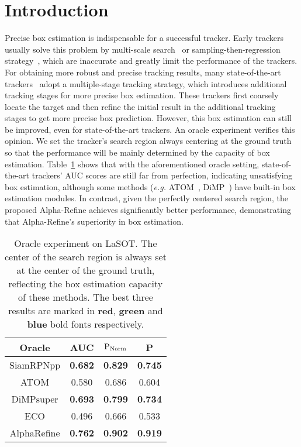 \documentclass[final]{cvpr}
\begin{document}
\section{Introduction}
Precise box estimation is indispensable for a successful tracker.
Early trackers usually solve this problem by multi-scale search~\cite{SiameseFC,ECO,DRT,unveiling} 
or sampling-then-regression strategy~\cite{SINT,MDNet}, which are inaccurate and greatly limit the performance of the trackers. 
For obtaining more robust and precise tracking results, many state-of-the-art trackers~\cite{SPM,CascadedSiameseRPN,ATOM,DiMP} 
adopt a multiple-stage tracking strategy, which introduces additional tracking stages for more precise box estimation. 
These trackers first coarsely locate the target and then refine the initial result in the additional tracking stages 
to get more precise box prediction.
However, this box estimation can still be improved, even for state-of-the-art trackers.
An oracle experiment verifies this opinion. 
We set the tracker’s search region always centering at the ground truth so that
the performance will be mainly determined by the capacity of box estimation.
Table~\ref{tab:oracle} shows that with the aforementioned oracle setting, state-of-the-art trackers' 
AUC scores are still far from perfection, indicating unsatisfying box estimation, although 
some methods (\emph{e.g.} ATOM~\cite{ATOM}, DiMP~\cite{DiMP}) have built-in box estimation modules. 
In contrast, given the perfectly centered search region, the proposed Alpha-Refine achieves significantly 
better performance, demonstrating that Alpha-Refine's superiority in box estimation.


\begin{table}[!t]
\caption{Oracle experiment on LaSOT. The center of the search region is always set at the center of the ground truth, 
reflecting the box estimation capacity of these methods. The best three results are marked in \textbf{\textcolor[rgb]{1,0,0}{red}}, \textbf{\textcolor[rgb]{0,1,0}{green}} and \textbf{\textcolor[rgb]{0,0,1}{blue}} bold fonts respectively.} 
\vspace{-1mm}
\begin{center}
\begin{tabular}{c|c|c|c}
\hline
\textbf{Oracle} & {\rm AUC} & ${\rm P_{Norm}}$ & {\rm P} \\
\hline
SiamRPNpp\cite{SiamRPNplus}&\textbf{\textcolor[rgb]{0,0,1}{0.682}}&\textbf{\textcolor[rgb]{0,1,0}{0.829}} & \textbf{\textcolor[rgb]{0,1,0}{0.745}}\\
ATOM\cite{ATOM}&0.580 &0.686 & 0.604  \\
DiMPsuper\cite{DiMP}&\textbf{\textcolor[rgb]{0,1,0}{0.693}}&\textbf{\textcolor[rgb]{0,0,1}{0.799}} & \textbf{\textcolor[rgb]{0,0,1}{0.734}}  \\
ECO\cite{ECO}&0.496&0.666 & 0.533  \\
\hline
AlphaRefine&\textbf{\textcolor[rgb]{1,0,0}{0.762}}&\textbf{\textcolor[rgb]{1,0,0}{0.902}} & \textbf{\textcolor[rgb]{1,0,0}{0.919}}  \\
\hline
\end{tabular}
\end{center}
\label{tab:oracle}
\vspace{-6mm}
\end{table}
\end{document}
